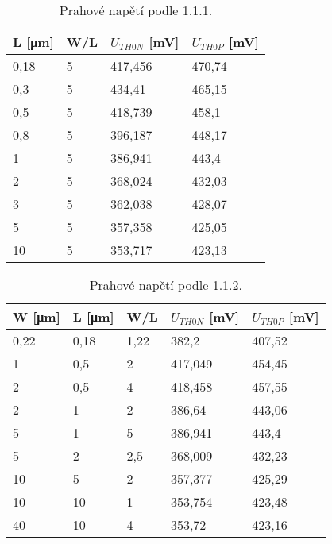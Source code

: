 \begin{table}[]
    \def\arraystretch{1.2}
    \centering
    \begin{tabular}{|l|l|l|l|}
    \hline
    L [\unit{\micro\meter}]    & W/L & \(U_{TH0 N}\) [mV] & \(U_{TH0 P}\) [mV] \\ \hline\hline
    0,18 & 5   & 417,456  & 470,74   \\ \hline
    0,3  & 5   & 434,41   & 465,15   \\ \hline
    0,5  & 5   & 418,739  & 458,1    \\ \hline
    0,8  & 5   & 396,187  & 448,17   \\ \hline
    1    & 5   & 386,941  & 443,4    \\ \hline
    2    & 5   & 368,024  & 432,03   \\ \hline
    3    & 5   & 362,038  & 428,07   \\ \hline
    5    & 5   & 357,358  & 425,05   \\ \hline
    10   & 5   & 353,717  & 423,13   \\ \hline
    \end{tabular}
    \caption{Prahové napětí podle 1.1.1.}
    \label{tab:1-1-1_hodnoty}
\end{table}

\begin{table}[]
    \def\arraystretch{1.2}
    \centering
    \begin{tabular}{|l|l|l|l|l|}
    \hline
    W [\unit{\micro\meter}]    & L [\unit{\micro\meter}]     & W/L  & \(U_{TH0 N}\) [mV] & \(U_{TH0 P}\) [mV] \\ \hline\hline
    0,22  & 0,18 & 1,22& 382,2  & 407,52   \\ \hline
    1    & 0,5  & 2    & 417,049   & 454,45   \\ \hline
    2    & 0,5  & 4    & 418,458  & 457,55    \\ \hline
    2    & 1    & 2    & 386,64  & 443,06   \\ \hline
    5    & 1    & 5    & 386,941  & 443,4    \\ \hline
    5    & 2    & 2,5  & 368,009  & 432,23   \\ \hline
    10   & 5    & 2    & 357,377  & 425,29   \\ \hline
    10   & 10   & 1    & 353,754  & 423,48   \\ \hline
    40   & 10   & 4    & 353,72  & 423,16   \\ \hline
    \end{tabular}
    \caption{Prahové napětí podle 1.1.2.}
    \label{tab:1-1-2_hodnoty}
\end{table}






